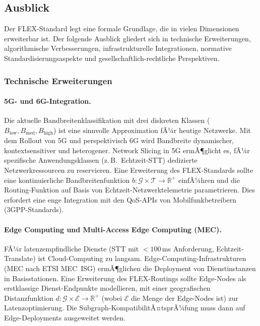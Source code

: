 ﻿\documentclass[a4paper,12pt]{article}
\theoremstyle{definition}
\begin{document}
\subsection{Ausblick}
\label{sec:ausblick}

Der FLEX-Standard legt eine formale Grundlage, die in vielen Dimensionen erweiterbar ist. Der folgende Ausblick gliedert sich in technische Erweiterungen, algorithmische Verbesserungen, infrastrukturelle Integrationen, normative Standardisierungsaspekte und gesellschaftlich-rechtliche Perspektiven.

\subsubsection{Technische Erweiterungen}

\paragraph{5G- und 6G-Integration.}
Die aktuelle Bandbreitenklassifikation mit drei diskreten Klassen ($B_\mathrm{low}, B_\mathrm{med}, B_\mathrm{high}$) ist eine sinnvolle Approximation fÃ¼r heutige Netzwerke. Mit dem Rollout von 5G und perspektivisch 6G wird Bandbreite dynamischer, kontextsensitiver und heterogener. Network Slicing in 5G ermÃ¶glicht es, fÃ¼r spezifische Anwendungsklassen (z.\,B.\ Echtzeit-STT) dedizierte Netzwerkressourcen zu reservieren. Eine Erweiterung des FLEX-Standards sollte eine kontinuierliche Bandbreitenfunktion $b: \mathcal{G} \times \mathcal{T} \to \mathbb{R}^+$ einfÃ¼hren und die Routing-Funktion auf Basis von Echtzeit-Netzwerktelemetrie parametrieren. Dies erfordert eine enge Integration mit den QoS-APIs von Mobilfunkbetreibern (3GPP-Standards).

\paragraph{Edge Computing und Multi-Access Edge Computing (MEC).}
FÃ¼r latenzempfindliche Dienste (STT mit $< 100$\,ms Anforderung, Echtzeit-Translate) ist Cloud-Computing zu langsam. Edge-Computing-Infrastrukturen (MEC nach ETSI MEC~ISG) ermÃ¶glichen die Deployment von Dienstinstanzen in Basisstationen. Eine Erweiterung des FLEX-Routings sollte Edge-Nodes als erstklassige Dienst-Endpunkte modellieren, mit einer geografischen Distanzfunktion $d: \mathcal{G} \times \mathcal{E} \to \mathbb{R}^+$ (wobei $\mathcal{E}$ die Menge der Edge-Nodes ist) zur Latenzoptimierung. Die Subgraph-KompatibilitÃ¤tsprÃ¼fung muss dann auf Edge-Deployments ausgeweitet werden.
\end{document}
